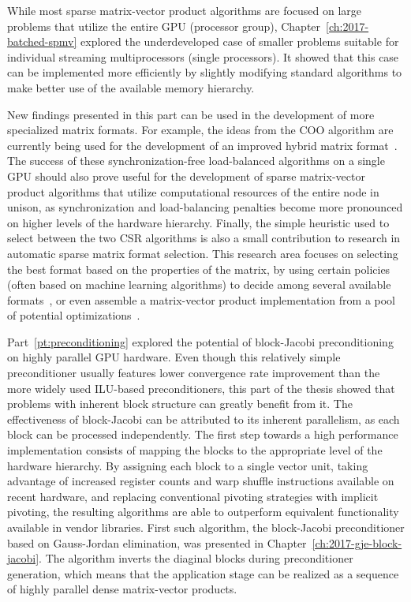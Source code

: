 While most sparse matrix-vector product algorithms are focused on large
problems that utilize the entire GPU (processor group),
Chapter~\ref{ch:2017-batched-spmv} explored the underdeveloped case of smaller
problems suitable for individual streaming multiprocessors (single processors).
It showed that this case can be implemented more efficiently by slightly
modifying standard algorithms to make better use of the available memory
hierarchy.

New findings presented in this part  can be used in the development of more
specialized matrix formats. For example, the ideas from the COO algorithm are
currently being used for the development of an improved hybrid matrix
format~\cite{hybrid}. The success of these synchronization-free load-balanced
algorithms on a single GPU should also prove useful for the development of
sparse matrix-vector product algorithms that utilize computational resources of
the entire node in unison, as synchronization and load-balancing penalties
become more pronounced on higher levels of the hardware hierarchy. Finally, the
simple heuristic used to select between the two CSR algorithms is also a small
contribution to research in automatic sparse matrix format selection. This
research area focuses on selecting the best format based on the properties of
the matrix, by using certain policies (often based on machine learning
algorithms) to decide among several available
formats~\cite{clspmv,gpu-selection}, or even assemble a matrix-vector product
implementation from a pool of potential optimizations~\cite{elafrou}.

Part~\ref{pt:preconditioning} explored the potential of block-Jacobi
preconditioning on highly parallel GPU hardware. Even though this relatively
simple preconditioner usually features lower convergence rate improvement than
the more widely used ILU-based preconditioners, this part of the thesis showed
that problems with inherent block structure can greatly benefit from it. The
effectiveness of block-Jacobi can be attributed to its inherent parallelism, as
each block can be processed independently. The first step towards a high
performance implementation consists of mapping the blocks to the appropriate
level of the hardware hierarchy. By assigning each block to a single vector
unit, taking advantage of increased register counts and warp shuffle
instructions available on recent hardware, and replacing conventional pivoting
strategies with implicit pivoting, the resulting algorithms are able to
outperform equivalent functionality available in vendor libraries. First such
algorithm, the block-Jacobi preconditioner based on Gauss-Jordan elimination,
was presented in Chapter~\ref{ch:2017-gje-block-jacobi}. The algorithm inverts
the diaginal blocks during preconditioner generation, which means that the
application stage can be realized as a sequence of highly parallel dense
matrix-vector products.

